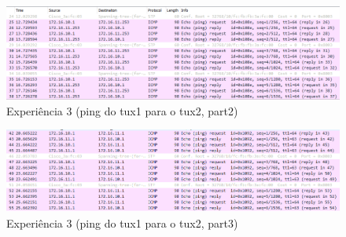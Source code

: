 \documentclass{article}
\begin{document}
\begin{figure}
    \centering
    \includegraphics[scale=0.6]{images/exp3_part2.PNG}
    \caption{Experiência 3 (ping do tux1 para o tux2, part2)}
    \label{fig:my_label}
\end{figure}
\begin{figure}
    \centering
    \includegraphics[scale=0.6]{images/exp3_part3.PNG}
    \caption{Experiência 3 (ping do tux1 para o tux2, part3)}
    \label{fig:my_label}
\end{figure}
\end{document}
